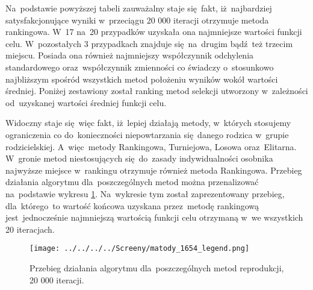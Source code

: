 Na~podstawie powyższej tabeli zauważalny staje się~fakt, iż~najbardziej satysfakcjonujące wyniki w~przeciągu 20 000 iteracji otrzymuje metoda rankingowa. W~17 na~20 przypadków uzyskała ona najmniejsze wartości funkcji celu. W~pozostałych 3 przypadkach znajduje się~na~drugim bądź~też trzecim miejscu. Posiada ona również najmniejszy współczynnik odchylenia standardowego oraz~współczynnik zmienności co świadczy o~stosunkowo najbliższym spośród wszystkich metod położeniu wyników wokół wartości średniej. Poniżej zestawiony został ranking metod selekcji utworzony w~zależności od~uzyskanej wartości średniej funkcji celu.\\

\begin{table}[h!]
\begin{center}
\caption{Ranking metod reprodukcji na podstawie średniej wartości błędu względnego funkcji celu, 20 000 iteracji.}
\label{ranking_1}
\end{center}
\end{table}

Widoczny staje się~więc fakt, iż~lepiej działają metody, w~których stosujemy ograniczenia co do~konieczności niepowtarzania się~danego rodzica w~grupie rodzicielskiej. A~więc~metody Rankingowa, Turniejowa, Losowa oraz~Elitarna. W~gronie metod niestosujących się~do~zasady indywidualności osobnika najwyższe miejsce w~rankingu otrzymuje również metoda Rankingowa. Przebieg działania algorytmu dla~poszczególnych metod można przenalizować na~podstawie wykresu \ref{ranking}. Na~wykresie tym został zaprezentowany przebieg, dla~którego~to wartość końcowa uzyskana przez~metodę rankingową jest~jednocześnie najmniejszą wartością funkcji celu otrzymaną w~we wszystkich 20 iteracjach.\\
\begin{figure}[ht]
		\texttt{[image: ../../../../Screeny/matody\_1654\_legend.png]}
		\caption{Przebieg działania algorytmu dla~poszczególnych metod reprodukcji, 20 000 iteracji.}
		\label{ranking}			
\end{figure}

